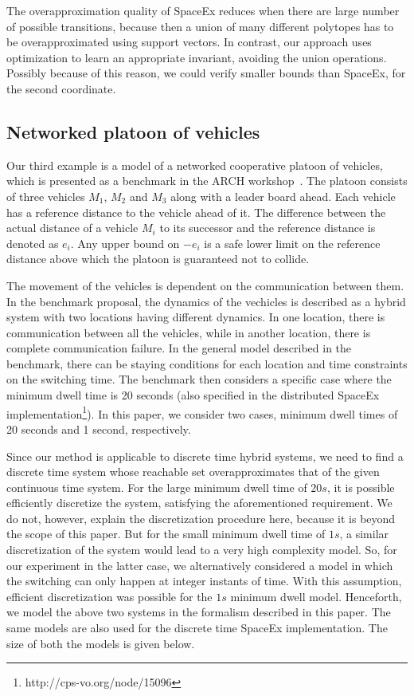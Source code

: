   The overapproximation quality of SpaceEx reduces when
there are large number of possible transitions, because then a union
of many different polytopes has to be overapproximated using support
vectors.  In contrast, our approach uses optimization to learn an
appropriate invariant, avoiding the union operations.  Possibly
because of this reason, we could verify smaller bounds than SpaceEx,
for the second coordinate.


\subsection{Networked platoon of vehicles}
Our third example is a model of a networked cooperative platoon of
vehicles, which is presented as a benchmark in the ARCH
workshop~\cite{makhlouf2014networked}.  The platoon consists of three
vehicles $M_1$, $M_2$ and $M_3$ along with a leader board ahead.  Each
vehicle has a reference distance to the vehicle ahead of it.  The
difference between the actual distance of a vehicle $M_i$ to its
successor and the reference distance is denoted as $e_i$.  Any upper
bound on $-e_i$ is a safe lower limit on the reference distance above
which the platoon is guaranteed not to collide.

The movement of the vehicles is dependent on the communication between
them.  In the benchmark proposal, the dynamics of the vechicles is
described as a hybrid system with two locations having different
dynamics.  In one location, there is communication between all the
vehicles, while in another location, there is complete communication
failure.  In the general model described in the benchmark, there can
be staying conditions for each location and time constraints on the
switching time.  The benchmark then considers a specific case where
the minimum dwell time is 20 seconds (also specified in the
distributed SpaceEx
implementation\footnote{http://cps-vo.org/node/15096}).  In this
paper, we consider two cases, minimum dwell times of 20 seconds and 1
second, respectively.


  Since our method is applicable to discrete time
hybrid systems, we need to find a discrete time system whose reachable
set overapproximates that of the given continuous time system.  For
the large minimum dwell time of $20s$, it is possible efficiently
discretize the system, satisfying the aforementioned requirement.  We
do not, however, explain the discretization procedure here, because it
is beyond the scope of this paper.  But for the small minimum dwell
time of $1s$, a similar discretization of the system would lead to a
very high complexity model.  So, for our experiment in the latter
case, we alternatively considered a model in which the switching can
only happen at integer instants of time.  With this assumption,
efficient discretization was possible for the $1s$ minimum dwell
model.  Henceforth, we model the above two systems in the formalism
described in this paper. The same models are also used for the
discrete time SpaceEx implementation.  The size of both the models is
given below.

